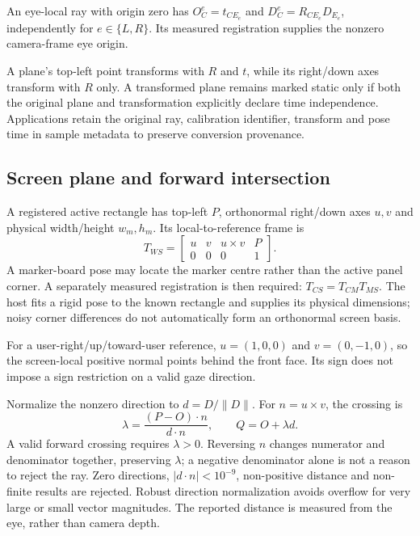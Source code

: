 \documentclass[sigconf,screen,nonacm]{acmart}
\begin{document}
An eye-local ray with origin zero has $O_C^e=t_{CE_e}$ and
$D_C^e=R_{CE_e}D_{E_e}$, independently for $e\in\{L,R\}$. Its measured
registration supplies the nonzero camera-frame eye origin.

A plane's top-left point transforms with $R$ and $t$, while its right/down axes
transform with $R$ only. A transformed plane remains marked static only if both
the original plane and transformation explicitly declare time independence.
Applications retain the original ray, calibration identifier, transform and pose
time in sample metadata to preserve conversion provenance.

\subsection{Screen plane and forward intersection}
A registered active rectangle has top-left $P$, orthonormal right/down axes $u,v$
and physical width/height $w_m,h_m$. Its local-to-reference frame is
\begin{equation}
 T_{WS}=\begin{bmatrix}u&v&u\times v&P\\0&0&0&1\end{bmatrix}.
\end{equation}
A marker-board pose may locate the marker centre rather than the active panel
corner. A separately measured registration is then required:
$T_{CS}=T_{CM}T_{MS}$. The host fits a rigid pose to the known rectangle and
supplies its physical dimensions; noisy corner differences do not automatically
form an orthonormal screen basis.

For a user-right/up/toward-user reference, $u=(1,0,0)$ and $v=(0,-1,0)$, so the
screen-local positive normal points behind the front face. Its sign does not
impose a sign restriction on a valid gaze direction.

Normalize the nonzero direction to $d=D/\|D\|$. For $n=u\times v$, the crossing is
\begin{equation}
 \lambda=\frac{(P-O)\cdot n}{d\cdot n},\qquad Q=O+\lambda d.
 \label{eq:intersection}
\end{equation}
A valid forward crossing requires $\lambda>0$. Reversing $n$ changes numerator
and denominator together, preserving $\lambda$; a negative denominator alone is
not a reason to reject the ray. Zero directions, $|d\cdot n|<10^{-9}$,
non-positive distance and non-finite results are rejected. Robust direction
normalization avoids overflow for very large or small vector magnitudes.
The reported distance is measured from the eye, rather than camera depth.
\end{document}
